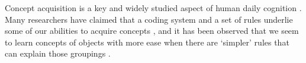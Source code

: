






Concept acquisition is a key and widely studied aspect of human daily cognition \cite{cohen2005handbook, ashby2011human}. Many researchers have claimed that a coding system and a set of rules underlie some of our  abilities to acquire concepts \cite{nosofsky1994rule,tenenbaum2011grow,maddox1993comparing}, and it has been observed that we seem to learn concepts of objects with more ease when there are `simpler' rules that can explain those groupings \cite{shepard1961learning, nosofsky1994comparing, rehder2005eyetracking, lewandowsky2011working,feldman2000minimization,blair2003easy,minda2001prototypes}. 

